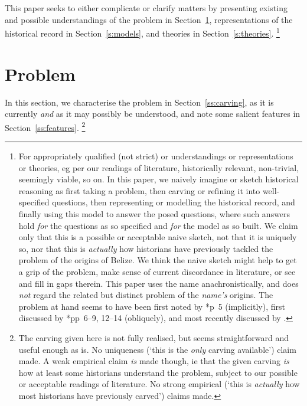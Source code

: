 	This paper seeks to either complicate or clarify matters by presenting existing and possible understandings of the problem in Section~\ref{s:problem}, representations of the historical record in Section~\ref{s:models}, and theories in Section~\ref{s:theories}.%
	\footnote{For appropriately qualified (not strict)  or  understandings or representations or theories, eg per our readings of literature, historically relevant, non-trivial, seemingly viable, so on. In this paper, we naively imagine or sketch historical reasoning as first taking a problem, then carving or refining it into well-specified questions, then representing or modelling the historical record, and finally using this model to answer the posed questions, where such answers hold \emph{for} the questions as so specified and \emph{for} the model as so built. We claim only that this is a possible or acceptable naive sketch, not that it is uniquely so, nor that this is \emph{actually} how historians have previously tackled the problem of the origins of Belize. We think the naive sketch might help to get a grip of the problem, make sense of current discordance in literature, or see and fill in gaps therein. This paper uses the name  anachronistically, and does \emph{not} regard the related but distinct problem of the \emph{name's} origins. The problem at hand seems to have been first noted by \cite{alm26}*{p~5} (implicitly), first discussed by \cite{nun77}*{pp~6--9, 12--14} (obliquely), and most recently discussed by .} %
%
%
%
%
\section{Problem}
\label{s:problem}
	In this section, we characterise the problem in Section~\ref{ss:carving}, as it is currently \emph{and} as it may possibly be understood, and note some salient features in Section~\ref{ss:features}.%
	\footnote{The carving given here is not fully realised, but seems straightforward and useful enough as is. No uniqueness (`this is the \emph{only} carving available') claim made. A weak empirical claim \emph{is} made though, ie that the given carving \emph{is} how at least some historians understand the problem, subject to our possible or acceptable readings of literature. No strong empirical (`this is \emph{actually} how most historians have previously carved') claims made.}
